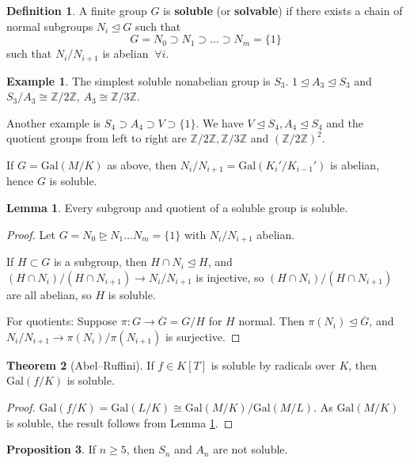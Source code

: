 \documentclass{article}
\theoremstyle{definition}
\newtheorem{theorem}{Theorem}[section]
\newtheorem{lemma}[theorem]{Lemma}
\newtheorem{prop}[theorem]{Proposition}
\newtheorem{example}{Example}[section]
\newtheorem{defn}{Definition}[section]
\begin{document}
\begin{defn}
    A finite group $G$ is \textbf{soluble} (or \textbf{solvable}) if there exists a chain of normal subgroups $N_i \trianglelefteq G$ such that \[
    G = N_0 \supset N_1 \supset \ldots \supset N_m = \{1\}
    \]
    such that $N_i/N_{i+1}$ is abelian $~\forall i$.
\end{defn}
\begin{example}
    The simplest soluble nonabelian group is $S_3$. $1 \trianglelefteq A_3 \trianglelefteq S_3$ and $S_3/A_3 \cong \mathbb{Z}/2\mathbb{Z}$, $A_3 \cong \mathbb{Z}/3\mathbb{Z}$.
    \vspace{1mm}
    
    Another example is $S_4 \supset A_4 \supset V \supset \{1\}$. We have $V \trianglelefteq S_4, A_4 \trianglelefteq S_4$ and the quotient groups from left to right are $\mathbb{Z}/2\mathbb{Z}, \mathbb{Z}/3\mathbb{Z}$ and $(\mathbb{Z}/2\mathbb{Z})^2$.
\end{example}
If $G=\text{Gal}(M/K)$ as above, then $N_i/N_{i+1}= \text{Gal}(K_i'/K_{i-1}')$ is abelian, hence $G$ is soluble.
\begin{lemma}\label{16.3}
    Every subgroup and quotient of a soluble group is soluble.
\end{lemma}    
\begin{proof}
    Let $G=N_0 \trianglerighteq N_1 \ldots N_m = \{1\}$ with $N_i/N_{i+1}$ abelian. \vspace{1mm}
    
    If $H \subset G$ is a subgroup, then $H \cap N_i \trianglelefteq H$, and $(H \cap N_i)/(H \cap N_{i+1}) \to N_i/N_{i+1}$ is injective, so $(H \cap N_i)/(H \cap N_{i+1})$ are all abelian, so $H$ is soluble.
    \vspace{1mm}
    
    For quotients: Suppose $\pi : G \to \overline{G} = G/H$ for $H$ normal. Then $\pi(N_i) \trianglelefteq \overline{G}$, and $N_i/N_{i+1} \to \pi(N_i)/\pi(N_{i+1})$ is surjective.
\end{proof}
\begin{theorem}[Abel--Ruffini]\label{16.4}
    If $f \in K[T]$ is soluble by radicals over $K$, then $\text{Gal}(f/K)$ is soluble.
\end{theorem}
\begin{proof}
    $\text{Gal}(f/K)=\text{Gal}(L/K) \cong \text{Gal}(M/K)/\text{Gal}(M/L)$. As $\text{Gal}(M/K)$ is soluble, the result follows from Lemma \ref{16.3}.
\end{proof}
\begin{prop}
    If $n\ge 5$, then $S_n$ and $A_n$ are not soluble.
\end{prop}
\end{document}
